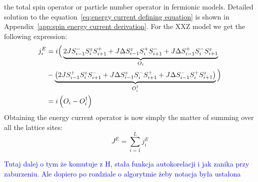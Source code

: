 the total spin operator or particle number operator in fermionic models. Detailed solution to the equation~\eqref{eq:energy current defining equation}
is shown in Appendix~\ref{app:spin energy current derivation}. For the XXZ model we get the following expression: 
\begin{align*}
  j_i^E &= i \Big( \underbrace{2J S^{-}_{i-1}S^{z}_i S^{+}_{i+1} + J \Delta S^{z}_{i-1}S^{+}_i S^{-}_{i+1} + J\Delta S^{+}_{i-1}S^{-}_iS^{z}_{i+1}}_{O_i} \\
  &- \underbrace{\left(2J S^{+}_{i-1}S^{z}_i S^{-}_{i+1} + J\Delta S^{z}_{i-1}S^{-}_i S^{+}_{i+1} + J\Delta S^{-}_{i-1}S^{+}_{i} S^{z}_{i+1} \right)}_{O_i^{\dagger}}\Big) \nonumber \\
  &= i\left(O_i - O_i^{\dagger}\right)
\end{align*}
Obtaining the energy current operator is now simply the matter of summing over all the lattice sites:
\begin{equation}
    J^E = \sum_{i=1}^L j_i^E
    \label{eq:energy current}
\end{equation}

\textcolor{blue}{Tutaj dalej o tym że komutuje z H, stała funkcja autokorelacji i jak zanika przy zaburzeniu. Ale dopiero po rozdziale o algorytmie żeby notacja była ustalona}